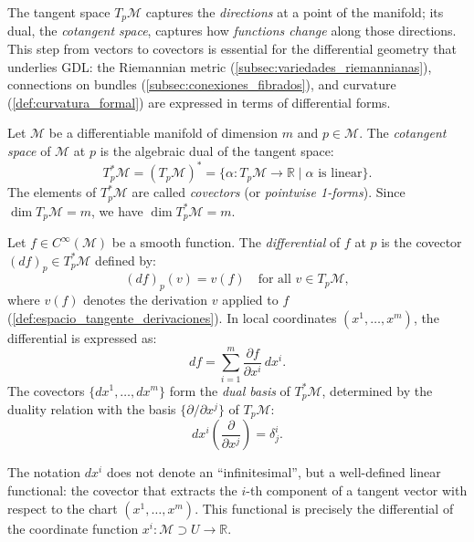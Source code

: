 The tangent space $T_p\mathcal{M}$ captures the \textit{directions} at a point of the manifold; its dual, the \textit{cotangent space}, captures how \textit{functions change} along those directions. This step from vectors to covectors is essential for the differential geometry that underlies \gls{GDL}: the Riemannian metric (\autoref{subsec:variedades_riemannianas}), connections on bundles (\autoref{subsec:conexiones_fibrados}), and curvature (\autoref{def:curvatura_formal}) are expressed in terms of differential forms.

\begin{definition}\label{def:espacio_cotangente}
Let $\mathcal{M}$ be a differentiable manifold of dimension $m$ and $p \in \mathcal{M}$. The \textit{cotangent space} of $\mathcal{M}$ at $p$ is the algebraic dual of the tangent space:
\[
T_p^*\mathcal{M} = (T_p\mathcal{M})^* = \{\alpha: T_p\mathcal{M} \to \mathbb{R} \mid \alpha \text{ is linear}\}.
\]
The elements of $T_p^*\mathcal{M}$ are called \textit{covectors} (or \textit{pointwise 1-forms}). Since $\dim T_p\mathcal{M} = m$, we have $\dim T_p^*\mathcal{M} = m$.
\end{definition}

\begin{definition}\label{def:diferencial_funcion}
Let $f \in C^\infty(\mathcal{M})$ be a smooth function. The \textit{differential} of $f$ at $p$ is the covector $(df)_p \in T_p^*\mathcal{M}$ defined by:
\[
(df)_p(v) = v(f) \quad \text{for all } v \in T_p\mathcal{M},
\]
where $v(f)$ denotes the derivation $v$ applied to $f$ (\autoref{def:espacio_tangente_derivaciones}). In local coordinates $(x^1, \ldots, x^m)$, the differential is expressed as:
\[
df = \sum_{i=1}^m \frac{\partial f}{\partial x^i} \, dx^i.
\]
The covectors $\{dx^1, \ldots, dx^m\}$ form the \textit{dual basis} of $T_p^*\mathcal{M}$, determined by the duality relation with the basis $\{\partial/\partial x^j\}$ of $T_p\mathcal{M}$:
\[
dx^i\!\left(\frac{\partial}{\partial x^j}\right) = \delta^i_j.
\]
\end{definition}

\begin{remark}\label{rem:notacion_base_dual}
The notation $dx^i$ does not denote an ``infinitesimal'', but a well-defined linear functional: the covector that extracts the $i$-th component of a tangent vector with respect to the chart $(x^1, \ldots, x^m)$. This functional is precisely the differential of the coordinate function $x^i: \mathcal{M} \supset U \to \mathbb{R}$.
\end{remark}

